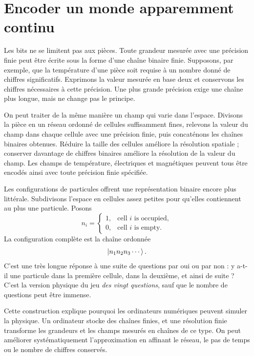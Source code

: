 \section{Encoder un monde apparemment continu}

Les bits ne se limitent pas aux pièces. Toute grandeur mesurée avec une précision finie peut être écrite sous la forme d’une chaîne binaire finie. Supposons, par exemple, que la température d’une pièce soit requise à un nombre donné de chiffres significatifs. Exprimons la valeur mesurée en base deux et conservons les chiffres nécessaires à cette précision. Une plus grande précision exige une chaîne plus longue, mais ne change pas le principe.

On peut traiter de la même manière un champ qui varie dans l’espace. Divisons la pièce en un réseau ordonné de cellules suffisamment fines, relevons la valeur du champ dans chaque cellule avec une précision finie, puis concaténons les chaînes binaires obtenues. Réduire la taille des cellules améliore la résolution spatiale ; conserver davantage de chiffres binaires améliore la résolution de la valeur du champ. Les champs de température, électriques et magnétiques peuvent tous être encodés ainsi avec toute précision finie spécifiée.

Les configurations de particules offrent une représentation binaire encore plus littérale. Subdivisons l’espace en cellules assez petites pour qu’elles contiennent au plus une particule. Posons
\begin{equation}
  n_i=
  \begin{cases}
    1,&\text{cell \(i\) is occupied},\\
    0,&\text{cell \(i\) is empty}.
  \end{cases}
  \label{eq:l01-occupancy-bit}
\end{equation}
La configuration complète est la chaîne ordonnée
\begin{equation}
  \left\lvert n_1n_2n_3\cdots\right\rangle.
\end{equation}
C’est une très longue réponse à une suite de questions par oui ou par non : y a-t-il une particule dans la première cellule, dans la deuxième, et ainsi de suite ? C’est la version physique du jeu \emph{des vingt questions}, sauf que le nombre de questions peut être immense.

Cette construction explique pourquoi les ordinateurs numériques peuvent simuler la physique. Un ordinateur stocke des chaînes finies, et une résolution finie transforme les grandeurs et les champs mesurés en chaînes de ce type. On peut améliorer systématiquement l’approximation en affinant le réseau, le pas de temps ou le nombre de chiffres conservés.

